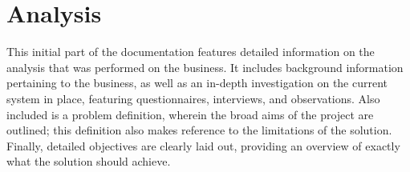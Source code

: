 \part{Analysis}
This initial part of the documentation features detailed information on the analysis that was performed on the business. It includes background information pertaining to the business, as well as an in-depth investigation on the current system in place, featuring questionnaires, interviews, and observations. Also included is a problem definition, wherein the broad aims of the project are outlined; this definition also makes reference to the limitations of the solution. Finally, detailed objectives are clearly laid out, providing an overview of exactly what the solution should achieve.







